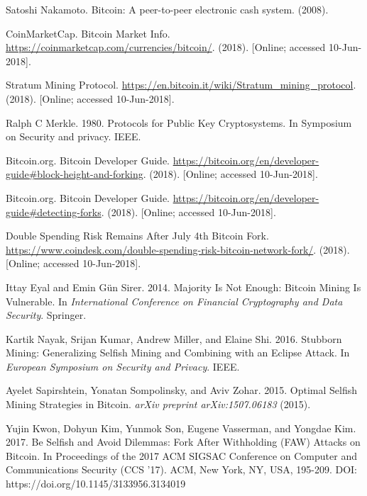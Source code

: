 \documentclass[a4paper, 11pt]{article}
\begin{document}
\begin{CJK*}{UTF8}{gbsn}
\begin{thebibliography}{8}
    Satoshi Nakamoto. Bitcoin: A peer-to-peer electronic cash system. (2008).

    CoinMarketCap. Bitcoin Market Info. 
    \url{https://coinmarketcap.com/currencies/bitcoin/}. 
    (2018). [Online; accessed 10-Jun-2018].


    Stratum Mining Protocol. 
    \url{https://en.bitcoin.it/wiki/Stratum_mining_protocol}.
    (2018). [Online; accessed 10-Jun-2018].
    
    
    Ralph C Merkle. 1980. Protocols for Public Key Cryptosystems. In Symposium on
    Security and privacy. IEEE.

    Bitcoin.org. Bitcoin Developer Guide. 
    \url{https://bitcoin.org/en/developer-guide#block-height-and-forking}.
    (2018). [Online; accessed 10-Jun-2018].


    Bitcoin.org. Bitcoin Developer Guide. 
    \url{https://bitcoin.org/en/developer-guide#detecting-forks}.
    (2018). [Online; accessed 10-Jun-2018].

    Double Spending Risk Remains After July 4th Bitcoin Fork.
    \url{https://www.coindesk.com/double-spending-risk-bitcoin-network-fork/}. 
    (2018). [Online; accessed 10-Jun-2018].

    Ittay Eyal and Emin Gün Sirer. 2014. Majority Is Not Enough: Bitcoin Mining
    Is Vulnerable. 
    In \textit{International Conference on Financial Cryptography and Data
    Security}. Springer.

    Kartik Nayak, Srijan Kumar, Andrew Miller, and Elaine Shi. 2016. Stubborn
    Mining: Generalizing Selfish Mining and Combining with an Eclipse Attack. 
    In \textit{European Symposium on Security and Privacy}. IEEE.

    Ayelet Sapirshtein, Yonatan Sompolinsky, and Aviv Zohar. 2015. Optimal Selfish
    Mining Strategies in Bitcoin.
    \textit{arXiv preprint arXiv:1507.06183} (2015).

    Yujin Kwon, Dohyun Kim, Yunmok Son, Eugene Vasserman, and Yongdae Kim. 2017. 
    Be Selfish and Avoid Dilemmas: Fork After Withholding (FAW) Attacks on Bitcoin. 
    In Proceedings of the 2017 ACM SIGSAC Conference on Computer and Communications Security (CCS '17). 
    ACM, New York, NY, USA, 195-209. DOI: https://doi.org/10.1145/3133956.3134019


\end{thebibliography}
\end{CJK*}
\end{document}
